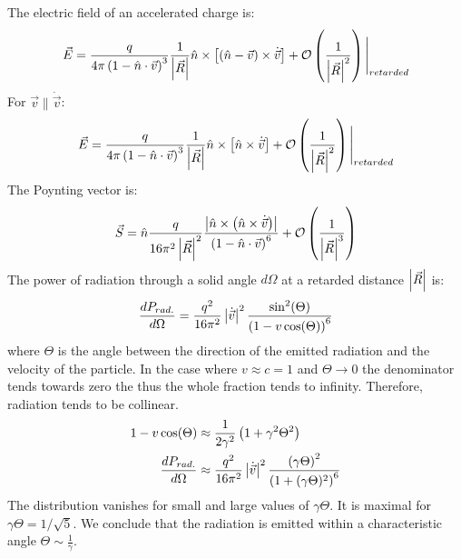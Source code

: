 The electric field of an accelerated charge is:
\begin{align*}
    \vec{E} = \frac{q}{4 \pi \left( 1 - \hat{n} \cdot \vec{v} \right)^3} \frac{1}{\left\vert \vec{R} \right\vert} \hat{n}
        \times \left[ \left( \hat{n} - \vec{v} \right) \times \dot{\vec{v}} \right]
        + \mathcal{O} \left( \frac{1}{\left\vert \vec{R} \right\vert^2} \right)
        \Bigg|_{retarded}
\end{align*}
For $\vec{v} \parallel \dot{\vec{v}}$:
\begin{align*}
    \vec{E} = \frac{q}{4 \pi \left( 1 - \hat{n} \cdot \vec{v} \right)^3} \frac{1}{\left\vert \vec{R} \right\vert} \hat{n}
        \times \left[ \hat{n} \times \dot{\vec{v}} \right]
        + \mathcal{O} \left( \frac{1}{\left\vert \vec{R} \right\vert^2} \right)
        \Bigg|_{retarded}
\end{align*}
The Poynting vector is:
\begin{align*}
    \vec{S} = \hat{n} \frac{q}{16 \pi^2 \left\vert \vec{R} \right\vert^2} \frac{\left\vert \hat{n} \times \left( \hat{n} \times \dot{\vec{v}} \right) \right\vert}{\left( 1 - \hat{n} \cdot \vec{v} \right)^6}
        + \mathcal{O} \left( \frac{1}{\left\vert \vec{R} \right\vert^3} \right)
\end{align*}
The power of radiation through a solid angle $d \Omega$ at a retarded
distance $\left\vert \vec{R} \right\vert$ is:
\begin{align*}
    \frac{d P_{rad.}}{d \Omega} = \frac{q^2}{16 \pi^2} \left\vert \dot{\vec{v}} \right\vert^2
        \frac{\sin^2(\Theta)}{\left( 1 - v \cos(\Theta) \right)^6}
\end{align*}
where $\Theta$ is the angle between the direction of the emitted radiation
and the velocity of the particle. In the case where $v \approx c = 1$ and
$\Theta \rightarrow 0$ the denominator tends towards zero the thus the whole
fraction tends to infinity. Therefore, radiation tends to be collinear.
\begin{align*}
    1 - v \cos(\Theta) &\approx \frac{1}{2 \gamma^2} \left( 1 + \gamma^2 \Theta^2 \right)
    \\
    \frac{d P_{rad.}}{d \Omega} &\approx \frac{q^2}{16 \pi^2} \left\vert \dot{\vec{v}} \right\vert^2
        \frac{\left( \gamma \Theta \right)^2}{\left( 1 + (\gamma \Theta)^2 \right)^6}
\end{align*}
The distribution vanishes for small and large values of $\gamma \Theta$.
It is maximal for $\gamma \Theta = 1/\sqrt{5}$. We conclude that the radiation
is emitted within a characteristic angle $\Theta \sim \frac{1}{\gamma}$.

